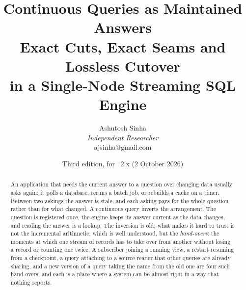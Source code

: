 \documentclass[11pt,a4paper]{article}
\title{\bfseries Continuous Queries as Maintained Answers\\[6pt]
{\large Exact Cuts, Exact Seams and Lossless Cutover\\
in a Single-Node Streaming SQL Engine}}
\author{Ashutosh Sinha\\[2pt]
{\normalsize\itshape Independent Researcher}\\[2pt]
{\normalsize\ttfamily ajsinha@gmail.com}}
\date{\normalsize Third edition, for \Pv\ 2.x (2 October 2026)}
\renewcommand{\_}{\oldunderscore\allowbreak}
\begin{document}

\maketitle

\begin{abstract}
\noindent
An application that needs the current answer to a question over changing data usually asks again:
it polls a database, reruns a batch job, or rebuilds a cache on a timer. Between two askings the
answer is stale, and each asking pays for the whole question rather than for what changed. A
continuous query inverts the arrangement. The question is registered once, the engine keeps its
answer current as the data changes, and reading the answer is a lookup. The inversion is old; what
makes it hard to trust is not the incremental arithmetic, which is well understood, but the
\emph{hand-overs}: the moments at which one stream of records has to take over from another without
losing a record or counting one twice. A subscriber joining a running view, a restart resuming from
a checkpoint, a query attaching to a source reader that other queries are already sharing, and a new
version of a query taking the name from the old one are four such hand-overs, and each is a place
where a system can be almost right in a way that nothing reports.


\end{abstract}
\end{document}
